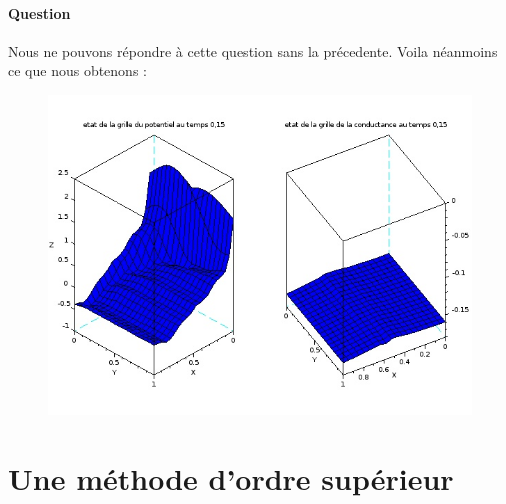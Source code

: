 \documentclass[11pt]{article}
\newcounter{question_num}
\begin{document}
	\paragraph{Question  \\}
	Nous ne pouvons répondre à cette question sans la précedente. Voila néanmoins ce que nous obtenons :
	\begin{figure}[H]
	\begin{center}
		\includegraphics[width=8 cm]{question11.jpeg}
		\caption{}
	\end{center}
	\end{figure}

\section{Une méthode d’ordre supérieur }

		
			
\end{document}
